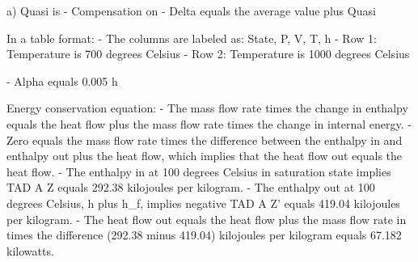 a) Quasi is
- Compensation on
- Delta equals the average value plus Quasi

In a table format:
- The columns are labeled as: State, P, V, T, h
- Row 1: Temperature is 700 degrees Celsius
- Row 2: Temperature is 1000 degrees Celsius

- Alpha equals 0.005 h

Energy conservation equation:
- The mass flow rate times the change in enthalpy equals the heat flow plus the mass flow rate times the change in internal energy.
- Zero equals the mass flow rate times the difference between the enthalpy in and enthalpy out plus the heat flow, which implies that the heat flow out equals the heat flow.
- The enthalpy in at 100 degrees Celsius in saturation state implies TAD A Z equals 292.38 kilojoules per kilogram.
- The enthalpy out at 100 degrees Celsius, h plus h_f, implies negative TAD A Z' equals 419.04 kilojoules per kilogram.
- The heat flow out equals the heat flow plus the mass flow rate in times the difference (292.38 minus 419.04) kilojoules per kilogram equals 67.182 kilowatts.